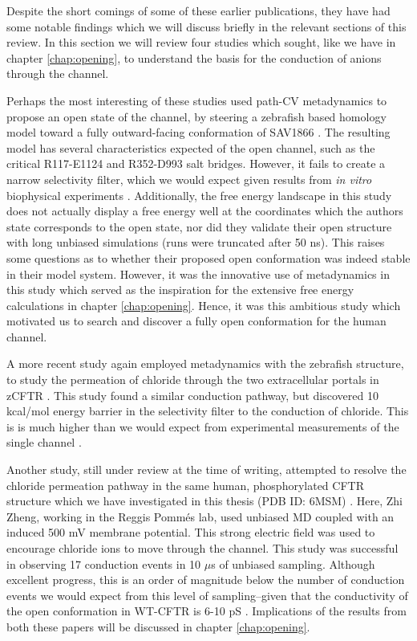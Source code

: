 Despite the short comings of some of these earlier publications, they have had some notable findings which we will discuss briefly in the relevant sections of this review. In this section we will review four studies which sought, like we have in chapter \ref{chap:opening}, to understand the basis for the conduction of anions through the channel.

Perhaps the most interesting of these studies used path-CV metadynamics to propose an open state of the channel, by steering a zebrafish based homology model toward a fully outward-facing conformation of SAV1866 \cite{hoffmann2018}. The resulting model has several characteristics expected of the open channel, such as the critical R117-E1124 and R352-D993 salt bridges. However, it fails to create a narrow selectivity filter, which we would expect given results from \textit{in vitro} biophysical experiments \cite{linsdell2016, linsdell2017, linsdell2021, li2018b, linsdell2020, negoda2019}. Additionally, the free energy landscape in this study does not actually display a free energy well at the coordinates which the authors state corresponds to the open state, nor did they validate their open structure with long unbiased simulations (runs were truncated after 50 ns). This raises some questions as to whether their proposed open conformation was indeed stable in their model system. However, it was the innovative use of metadynamics in this study which served as the inspiration for the extensive free energy calculations in chapter \ref{chap:opening}. Hence, it was this ambitious study which motivated us to search and discover a fully open conformation for the human channel. 

A more recent study again employed metadynamics with the zebrafish structure, to study the permeation of chloride through the two extracellular portals in zCFTR \cite{farkas2020}. This study found a similar conduction pathway, but discovered 10 kcal/mol energy barrier in the selectivity filter to the conduction of chloride. This is is much higher than we would expect from experimental measurements of the single channel \cite{jun2016,gong2004}. 

Another study, still under review at the time of writing, attempted to resolve the chloride permeation pathway in the same human, phosphorylated CFTR structure which we have investigated in this thesis (PDB ID: 6MSM) \cite{zeng2021}. Here, Zhi Zheng, working in the Reggis Pomm\'es lab, used unbiased MD coupled with an induced 500 mV membrane potential. This strong electric field was used to encourage chloride ions to move through the channel. This study was successful in observing 17 conduction events in 10 $\mu$s of unbiased sampling. Although excellent progress, this is an order of magnitude below the number of conduction events we would expect from this level of sampling--given that the conductivity of the open conformation in WT-CFTR is 6-10 pS \cite{kogan2003,linsdell1998}. Implications of the results from both these papers will be discussed in chapter \ref{chap:opening}.

